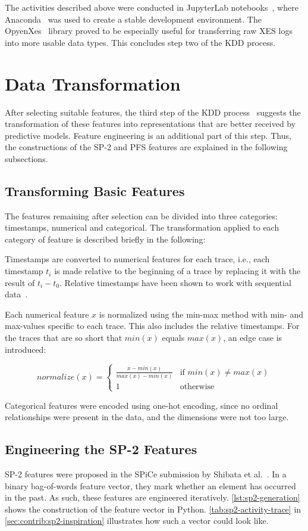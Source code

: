 The activities described above were conducted in JupyterLab notebooks~\cite{web:jupyter}, where Anaconda~\cite{web:anaconda} was used to create a stable development environment. The OpyenXes~\cite{web:opyenxes} library proved to be especially useful for transferring raw XES logs into more usable data types. This concludes step two of the KDD process.

\section{Data Transformation}\label{sec:method:data-transformation}
After selecting suitable features, the third step of the KDD process~\cite{fayyad1996data} suggests the transformation of these features into representations that are better received by predictive models. Feature engineering is an additional part of this step. Thus, the constructions of the SP-2 and PFS features are explained in the following subsections.

\subsection*{Transforming Basic Features}
The features remaining after selection can be divided into three categories: timestamps, numerical and categorical. The transformation applied to each category of feature is described briefly in the following:

Timestamps are converted to numerical features for each trace, i.e., each timestamp $t_i$ is made relative to the beginning of a trace by replacing it with the result of $t_i - t_0$. Relative timestamps have been shown to work with sequential data~\cite{lessmannBADS}.

Each numerical feature $x$ is normalized using the min-max method with min- and max-values specific to each trace. This also includes the relative timestamps. For the traces that are so short that $min(x)$ equals $max(x)$, an edge case is introduced:

$$normalize(x) =
\begin{cases}
\frac{x-min(x)}{max(x)-min(x)} & \text{if } min(x) \neq max(x)\\
1 & \text{otherwise}
\end{cases}
$$

Categorical features were encoded using one-hot encoding, since no ordinal relationships were present in the data, and the dimensions were not too large.

\subsection*{Engineering the SP-2 Features}
SP-2 features were proposed in the SPiCe submission by Shibata et al.~\cite{shibata2016bipartite}. In a binary bag-of-words feature vector, they mark whether an element has occurred in the past. As such, these features are engineered iteratively. \autoref{lst:sp2-generation} shows the construction of the feature vector in Python.
\autoref{tab:sp2-activity-trace} in \autoref{sec:contrib:sp2-inspiration} illustrates how such a vector could look like.

